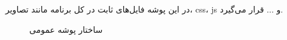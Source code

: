 در این پوشه فایل‌های ثابت در کل برنامه مانند تصاویر، css، js و ... قرار می‌گیرد.

\begin{figure}[H]
	\centering
	\caption{ساختار پوشه عمومی}
	\label{fig:folder-public}
\end{figure}
